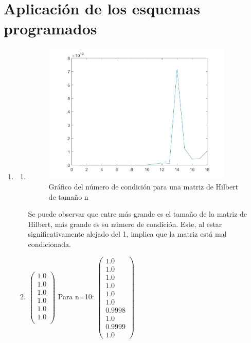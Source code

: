 \documentclass{udpreport}
\begin{document}
 \section{Aplicación de los esquemas programados}
 \begin{enumerate}
 	\item   
 		\begin{enumerate}
 			\item 	
 			\begin{figure}[H]
 				\centering
 				\includegraphics[width=9cm]{grafo1-a}
 				\caption{Gráfico del número de condición para una matriz de Hilbert de tamaño n}
 			\end{figure}
 			Se puede observar que entre más grande es el tamaño de la matriz de Hilbert, más grande es su número de condición. Este, al estar significativamente alejado del 1, implica que la matriz está mal condicionada.  %
 			\item 
 				$\left(\begin{array}{c} 1.0\\ 1.0\\ 1.0\\ 1.0\\ 1.0\\ 1.0\\ \end{array}\right)$
 				Para n=10:
 				$\left(\begin{array}{c} 1.0\\ 1.0\\ 1.0\\ 1.0\\ 1.0\\ 1.0\\ 0.9998\\ 1.0\\ 0.9999\\ 1.0 \end{array}\right)$

\end{enumerate}
\end{enumerate}
\end{document}
